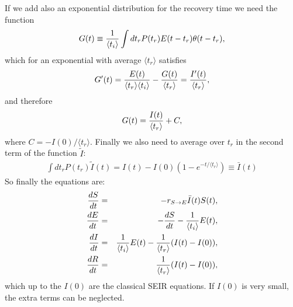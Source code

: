 \documentclass[a4paper,oneside,11pt]{article}
\begin{document}
If we add also an exponential distribution for the recovery time we need the function
\begin{eqnarray}
G(t) \equiv {1\over \langle t_i\rangle } \int dt_r P(t_r) E(t-t_r) \theta(t-t_r),
\end{eqnarray}
which for an exponential with average $\langle t_r\rangle$ satisfies
\begin{eqnarray}
G'(t) = {E(t)\over \langle t_r\rangle \langle t_i\rangle} - {G(t)\over  \langle t_r\rangle} = {I'(t)\over \langle t_r \rangle},
\end{eqnarray}
and therefore
\begin{eqnarray}
G(t) = {I(t)\over \langle t_r \rangle} + C,
\end{eqnarray}
where $C= -I(0)/\langle t_r \rangle$.
Finally we also need to average over $t_r$ in the second term of the function $\tilde{I}$:
\begin{eqnarray}
\int d t_r P(t_r) \tilde{I}(t) = I(t) - I(0) \left(1- e^{-t/\langle t_r\rangle}  \right) \equiv \bar{I}(t)
\end{eqnarray}
 So finally the equations are:
\begin{eqnarray}
{d S\over dt} &=& - r_{S\rightarrow E} \bar{I}(t) S(t),\nonumber\\
{d E\over dt} &=& -{d S\over d t} -{1 \over \langle t_i\rangle} E(t) ,\nonumber\\
{d I\over dt} &=& {1 \over \langle t_i\rangle} E(t) - {1\over  \langle t_r \rangle} (I(t) -I(0)),\nonumber\\
{d R\over d t} &=&  {1\over  \langle t_r\rangle} (I(t)-I(0)),\nonumber\\
\label{eqs:seirexp}
\end{eqnarray}
which up to the $I(0)$ are the classical SEIR equations. If $I(0)$ is very small, the extra terms
 can  be neglected.
\end{document}
